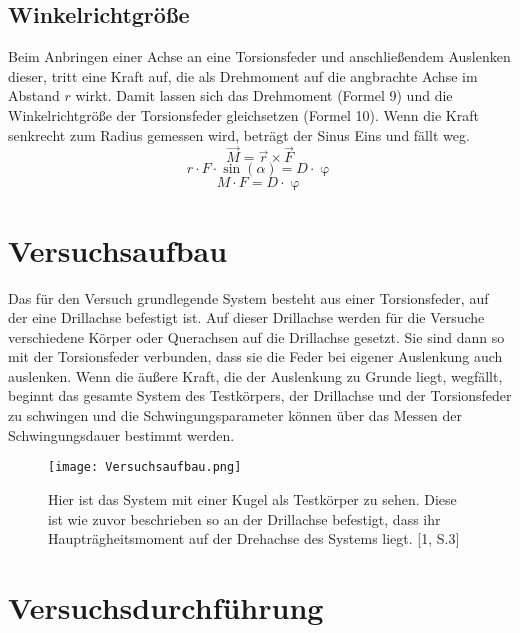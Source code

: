 \documentclass[titlepage = firstcover]{scrartcl}
\begin{document}
      \subsection{Winkelrichtgröße}
      Beim Anbringen einer Achse an eine Torsionsfeder und anschließendem Auslenken dieser, tritt eine Kraft auf, die als Drehmoment auf die angbrachte Achse im Abstand $r$
      wirkt. Damit lassen sich das Drehmoment (Formel 9) und die Winkelrichtgröße der Torsionsfeder gleichsetzen (Formel 10). Wenn die Kraft senkrecht zum Radius gemessen wird,
      beträgt der Sinus Eins und fällt weg.
      \begin{equation}
        \vec{M} = \vec{r} \times \vec{F}
      \end{equation}
      \begin{equation}
        r \cdot F \cdot \sin(\alpha) = D \cdot \upvarphi
      \end{equation}
      \begin{equation*}
        M \cdot F = D \cdot \upvarphi
      \end{equation*} 
    
    \section{Versuchsaufbau}
      Das für den Versuch grundlegende System besteht aus einer Torsionsfeder, auf der eine Drillachse befestigt ist. Auf dieser Drillachse werden für die Versuche
      verschiedene Körper oder Querachsen auf die Drillachse gesetzt. Sie sind dann so mit der Torsionsfeder verbunden, dass sie die Feder bei eigener Auslenkung auch
      auslenken. Wenn die äußere Kraft, die der Auslenkung zu Grunde liegt, wegfällt, beginnt das gesamte System des Testkörpers, der Drillachse und der 
      Torsionsfeder zu schwingen und die Schwingungsparameter können über das Messen der Schwingungsdauer bestimmt werden.
      \newpage
      \begin{figure}[h]
        \centering
        \texttt{[image: Versuchsaufbau.png]}
        \caption{Hier ist das System mit einer Kugel als Testkörper zu sehen. Diese ist wie zuvor beschrieben so an der Drillachse befestigt, dass ihr Haupträgheitsmoment auf der Drehachse des Systems liegt. [1, S.3]}
      \end{figure}

    \section{Versuchsdurchführung}
\end{document}
